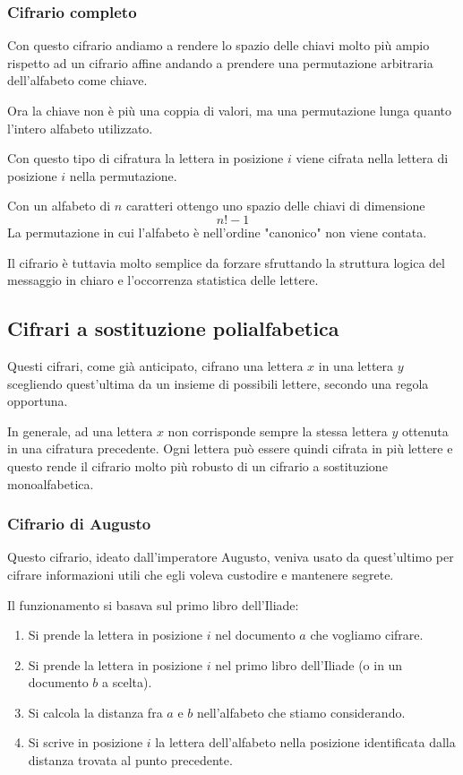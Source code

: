 \subsubsection{Cifrario completo}
Con questo cifrario andiamo a rendere lo spazio delle chiavi molto pi\`u ampio rispetto ad un cifrario affine andando a
prendere una permutazione arbitraria dell'alfabeto come chiave.

Ora la chiave non \`e pi\`u una coppia di valori, ma una permutazione lunga quanto l'intero alfabeto utilizzato.

Con questo tipo di cifratura la lettera in posizione $i$ viene cifrata nella lettera di posizione $i$ nella permutazione.

Con un alfabeto di $n$ caratteri ottengo uno spazio delle chiavi di dimensione
\[ n! - 1 \]
La permutazione in cui l'alfabeto \`e nell'ordine "canonico" non viene contata.

Il cifrario \`e tuttavia molto semplice da forzare sfruttando la struttura logica del messaggio in chiaro e l'occorrenza
statistica delle lettere.

\subsection{Cifrari a sostituzione polialfabetica}
Questi cifrari, come gi\`a anticipato, cifrano una lettera $x$ in una lettera $y$ scegliendo quest'ultima da un insieme
di possibili lettere, secondo una regola opportuna.

In generale, ad una lettera $x$ non corrisponde sempre la stessa lettera $y$ ottenuta in una cifratura precedente. Ogni
lettera pu\`o essere quindi cifrata in pi\`u lettere e questo rende il cifrario molto pi\`u robusto di un cifrario
a sostituzione monoalfabetica.

\subsubsection{Cifrario di Augusto}
Questo cifrario, ideato dall'imperatore Augusto, veniva usato da quest'ultimo per cifrare informazioni utili che egli
voleva custodire e mantenere segrete.

Il funzionamento si basava sul primo libro dell'Iliade:
\begin{enumerate}
	\item Si prende la lettera in posizione $i$ nel documento $a$ che vogliamo cifrare.
	\item Si prende la lettera in posizione $i$ nel primo libro dell'Iliade (o in un documento $b$ a scelta).
	\item Si calcola la distanza fra $a$ e $b$ nell'alfabeto che stiamo considerando.
	\item Si scrive in posizione $i$ la lettera dell'alfabeto nella posizione identificata dalla distanza trovata al
	      punto precedente.
\end{enumerate}


